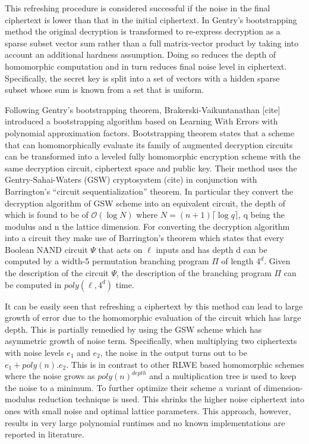 \documentclass[10pt,journal,compsoc]{IEEEtran}
\theoremstyle{definition}
\begin{document}
This refreshing procedure is considered successful if the noise in the final ciphertext is lower than that in the initial ciphertext. In Gentry's bootstrapping method the original decryption is transformed  to re-express decryption as a sparse subset vector sum rather than a full matrix-vector product by taking into account an additional hardness assumption. Doing so reduces the depth of homomorphic computation and in turn reduces final noise level in ciphertext. Specifically, the secret key is split into a set of vectors with a hidden sparse subset whose sum is known from a set that is uniform. 

Following Gentry's bootstrapping theorem, Brakerski-Vaikuntanathan [cite] introduced a bootstrapping algorithm based on Learning With Errors with polynomial approximation factors. Bootstrapping theorem states that a scheme that can homomorphically evaluate its family of augmented decryption circuits can be transformed into a leveled fully homomorphic encryption scheme with the same decryption circuit, ciphertext space and public key. Their method uses the Gentry-Sahai-Waters (GSW) cryptosystem (cite) in conjunction with Barrington’s ``circuit sequentialization'' theorem. In particular they convert the decryption algorithm of GSW scheme into an equivalent circuit, the depth of which is found to be of $\mathcal{O}\left(\log N \right)$ where $N = (n+1)\lceil \log q \rceil$, q being the modulus and n the lattice dimension. For converting the decryption algorithm into a circuit they make use of Barrington's theorem which states that every Boolean NAND circuit $\Psi$ that acts on  $\ell$ inputs and has depth d can be computed by a width-5 permutation branching program $\Pi$ of length $4^d$. Given the description of the circuit $\Psi$, the description of the branching program $\Pi$ can be computed in $poly(\ell, 4^d)$ time. 

It can be easily seen that refreshing a ciphertext by this method can lead to large growth of error due to the homomorphic evaluation of the circuit which has large depth. This is partially remedied by using the GSW scheme which has asymmetric growth of noise term. Specifically, when multiplying two
ciphertexts with noise levels $e_1$ and $e_2$, the noise in the output turns out to be $e_1 + poly(n) .e_2$. This is in contrast to other RLWE based homomorphic schemes where the noise grows as $poly(n)^{depth}$ and a multiplication tree is used to keep the noise to a minimum. To further optimize their scheme a variant of dimension-modulus reduction technique is used. This shrinks the higher noise ciphertext into ones with small noise and optimal lattice parameters. This approach, however, results in very large polynomial runtimes and no known implementations are reported in literature. 
\end{document}
